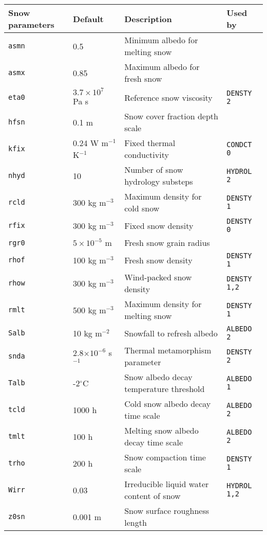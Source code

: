 \documentclass{article}
\begin{document}
\begin{longtable}{|l|l|l|l|} \hline
Snow parameters  & Default  & Description                             & Used by       \\ \hline
{\tt asmn} & 0.5            & Minimum albedo for melting snow         &               \\
{\tt asmx} & 0.85           & Maximum albedo for fresh snow           &               \\
{\tt eta0} & $3.7\times10^7$ Pa s & Reference snow viscosity          &{\tt DENSTY 2} \\
{\tt hfsn} & 0.1 m          & Snow cover fraction depth scale         &               \\
{\tt kfix} & 0.24 W m$^{-1}$ K$^{-1}$ & Fixed thermal conductivity    &{\tt CONDCT 0} \\
{\tt nhyd} & 10             & Number of snow hydrology substeps       &{\tt HYDROL 2} \\
{\tt rcld} & 300 kg m$^{-3}$ & Maximum density for cold snow          &{\tt DENSTY 1} \\
{\tt rfix} & 300 kg m$^{-3}$ & Fixed snow density                     &{\tt DENSTY 0} \\
{\tt rgr0} & $5\times10^{-5}$ m & Fresh snow grain radius             &               \\
{\tt rhof} & 100 kg m$^{-3}$ & Fresh snow density                     &{\tt DENSTY 1} \\
{\tt rhow} & 300 kg m$^{-3}$ & Wind-packed snow density               &{\tt DENSTY 1,2} \\
{\tt rmlt} & 500 kg m$^{-3}$ & Maximum density for melting snow       &{\tt DENSTY 1} \\
{\tt Salb} & 10 kg m$^{-2}$ & Snowfall to refresh albedo              &{\tt ALBEDO 2} \\
{\tt snda} & 2.8$\times10^{-6}$ s$^{-1}$ & Thermal metamorphism parameter &{\tt DENSTY 2} \\
{\tt Talb} & -2$^\circ$C    & Snow albedo decay temperature threshold &{\tt ALBEDO 1} \\
{\tt tcld} & 1000 h         & Cold snow albedo decay time scale       &{\tt ALBEDO 2} \\
{\tt tmlt} & 100 h          & Melting snow albedo decay time scale    &{\tt ALBEDO 2} \\
{\tt trho} & 200 h          & Snow compaction time scale              &{\tt DENSTY 1} \\ 
{\tt Wirr} & 0.03           & Irreducible liquid water content of snow&{\tt HYDROL 1,2} \\
{\tt z0sn} & 0.001 m        & Snow surface roughness length           &               \\ \hline 
\end{longtable}
\end{document}
